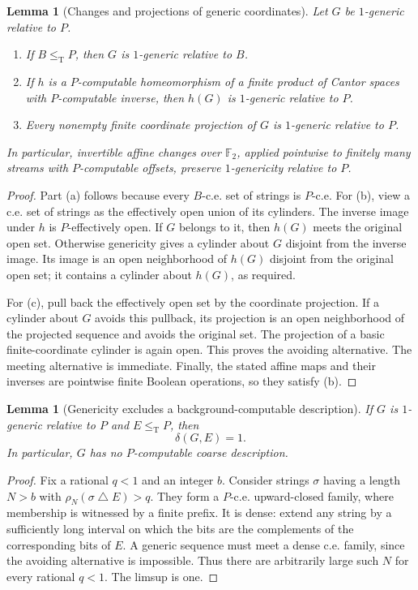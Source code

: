 \documentclass[11pt,letterpaper]{article}
\theoremstyle{plain}
\newtheorem{lemma}[theorem]{Lemma}
\theoremstyle{definition}
\theoremstyle{remark}
\numberwithin{equation}{section}
\newcommand{\leT}{\leq_{\mathrm T}}
\newcommand{\bitsum}{\mathbin{\triangle}}
\begin{document}
\begin{lemma}[Changes and projections of generic coordinates]\label{cr11:lem:genericmaps}
Let $G$ be $1$-generic relative to $P$.
\begin{enumerate}[label=\textup{(\alph*)}]
\item If $B\leT P$, then $G$ is $1$-generic relative to $B$.
\item If $h$ is a $P$-computable homeomorphism of a finite product of
Cantor spaces with $P$-computable inverse, then $h(G)$ is $1$-generic
relative to $P$.
\item Every nonempty finite coordinate projection of $G$ is $1$-generic
relative to $P$.
\end{enumerate}
In particular, invertible affine changes over $\mathbb F_2$, applied
pointwise to finitely many streams with $P$-computable offsets, preserve
$1$-genericity relative to $P$.
\end{lemma}
\begin{proof}
Part (a) follows because every $B$-c.e. set of strings is $P$-c.e. For (b),
view a c.e. set of strings as the effectively open union of its cylinders.
The inverse image under $h$ is $P$-effectively open. If $G$ belongs to it,
then $h(G)$ meets the original open set. Otherwise genericity gives a
cylinder about $G$ disjoint from the inverse image. Its image is an open
neighborhood of $h(G)$ disjoint from the original open set; it contains a
cylinder about $h(G)$, as required.

For (c), pull back the effectively open set by the coordinate projection.
If a cylinder about $G$ avoids this pullback, its projection is an open
neighborhood of the projected sequence and avoids the original set. The
projection of a basic finite-coordinate cylinder is again open. This proves
the avoiding alternative. The meeting alternative is immediate. Finally,
the stated affine maps and their inverses are pointwise finite Boolean
operations, so they satisfy (b).
\end{proof}

\begin{lemma}[Genericity excludes a background-computable description]\label{cr11:lem:nodescription}
If $G$ is $1$-generic relative to $P$ and $E\leT P$, then
\[
                         \delta(G,E)=1.
\]
In particular, $G$ has no $P$-computable coarse description.
\end{lemma}
\begin{proof}
Fix a rational $q<1$ and an integer $b$. Consider strings $\sigma$ having a
length $N>b$ with $\rho_N(\sigma\bitsum E)>q$. They form a $P$-c.e.
upward-closed family, where membership is witnessed by a finite prefix.
It is dense: extend any string by a sufficiently long interval on which
the bits are the complements of the corresponding bits of $E$.
A generic sequence must meet a dense c.e. family, since the avoiding
alternative is impossible. Thus there are arbitrarily large such $N$ for
every rational $q<1$. The limsup is one.
\end{proof}
\end{document}
